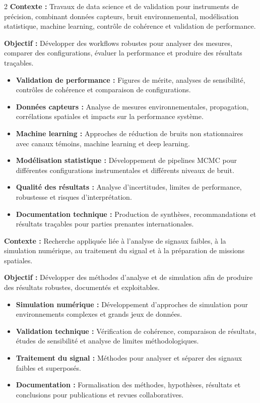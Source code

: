 \documentclass[8pt,a4paper,ragged2e,withhyper]{altacv}
\begin{document}
\begin{paracol}{2}
\textbf{Contexte :} Travaux de data science et de validation pour instruments de précision, combinant données capteurs, bruit environnemental, modélisation statistique, machine learning, contrôle de cohérence et validation de performance.

\textbf{Objectif :} Développer des workflows robustes pour analyser des mesures, comparer des configurations, évaluer la performance et produire des résultats traçables.

\begin{itemize}
  \item \textbf{Validation de performance :} Figures de mérite, analyses de sensibilité, contrôles de cohérence et comparaison de configurations.
  \item \textbf{Données capteurs :} Analyse de mesures environnementales, propagation, corrélations spatiales et impacts sur la performance système.
  \item \textbf{Machine learning :} Approches de réduction de bruits non stationnaires avec canaux témoins, machine learning et deep learning.
  \item \textbf{Modélisation statistique :} Développement de pipelines MCMC pour différentes configurations instrumentales et différents niveaux de bruit.
  \item \textbf{Qualité des résultats :} Analyse d’incertitudes, limites de performance, robustesse et risques d’interprétation.
  \item \textbf{Documentation technique :} Production de synthèses, recommandations et résultats traçables pour parties prenantes internationales.
\end{itemize}

\divider


\textbf{Contexte :} Recherche appliquée liée à l’analyse de signaux faibles, à la simulation numérique, au traitement du signal et à la préparation de missions spatiales.

\textbf{Objectif :} Développer des méthodes d’analyse et de simulation afin de produire des résultats robustes, documentés et exploitables.

\begin{itemize}
  \item \textbf{Simulation numérique :} Développement d’approches de simulation pour environnements complexes et grands jeux de données.
  \item \textbf{Validation technique :} Vérification de cohérence, comparaison de résultats, études de sensibilité et analyse de limites méthodologiques.
  \item \textbf{Traitement du signal :} Méthodes pour analyser et séparer des signaux faibles et superposés.
  \item \textbf{Documentation :} Formalisation des méthodes, hypothèses, résultats et conclusions pour publications et revues collaboratives.
\end{itemize}


\end{paracol}
\end{document}
